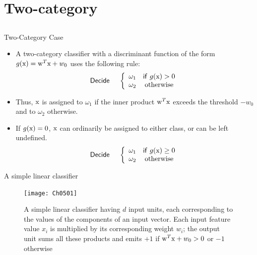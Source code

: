 \section{Two-category}
\subsection{}
\begin{frame}{Two-Category Case}
\begin{itemize}
\setlength{\itemsep}{12pt}
\item A two-category classifier with a discriminant function of the form $g({\rm x})={\rm w}^T{\rm x}+w_0$ uses the following rule:\\
\begin{equation}
{\sf Decide}~~~~\left\{ {\begin{array}{*{20}{c}}
{{\omega_1}}&{{\sf if}~g({\rm x}) > 0}\\
{{\omega_2}}&{\rm otherwise}
\end{array}} \right.\nonumber
\end{equation}
\item Thus, ${\rm x}$ is assigned to $\omega_1$ if the {\color{mycolor2}inner product} ${\rm w}^T{\rm x}$ exceeds the
threshold $-w_0$ and to $\omega_2$ otherwise.
\item If $g({\rm x})=0$, ${\rm x}$ can ordinarily be assigned to either class, or can be left undefined.
\begin{equation}
{\sf Decide}~~~~\left\{ {\begin{array}{*{20}{c}}
{{\omega_1}}&{{\sf if}~g({\rm x}) \geq 0}\\
{{\omega_2}}&{\rm otherwise}
\end{array}} \right.\nonumber
\end{equation}
\end{itemize}
\end{frame}

\begin{frame}{A simple linear classifier}
\begin{figure}
\texttt{[image: Ch0501]}
\caption{A simple linear classifier having $d$ input units, each corresponding to the values of the components of an input vector. Each input feature value $x_i$ is multiplied by its corresponding weight $w_i$; the output unit sums all these products and emits $+1$ if ${\rm w}^T{\rm x}+w_0>0$ or $-1$ otherwise}
\end{figure}
\end{frame}

